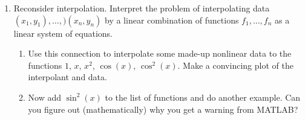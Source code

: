 \documentclass[11pt]{article}
\begin{document}
\begin{enumerate}
\item Reconsider interpolation. Interpret the problem of interpolating data
  $(x_1,y_1),\ldots,)(x_n,y_n)$ by a linear combination of functions
  $f_1,\ldots,f_n$ as a linear system of equations. 
  \begin{enumerate}
  \item Use this
  connection to interpolate some made-up nonlinear data to the functions $1$,
  $x$, $x^2$,
  $\cos(x)$, $\cos^2(x)$. Make a convincing plot of the interpolant
  and data. 
\item Now add $\sin^2(x)$ to the list of functions and do another
  example. Can you figure out (mathematically) why you get a warning from MATLAB?
  \end{enumerate}


\end{enumerate}
\end{document}
